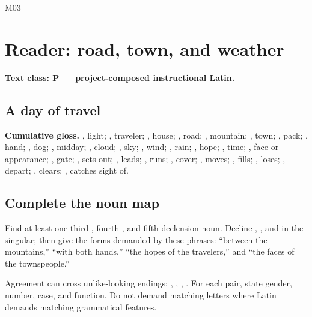 \begin{courseunit}{M03}
\chapter{Reader: road, town, and weather}

\textbf{Text class: P --- project-composed instructional Latin.}

\section{A day of travel}


\textbf{Cumulative gloss.} , light; , traveler;
, house; , road; , mountain;
, town; , pack; , hand;
, dog; , midday; , cloud;
, sky; , wind; , rain;
, hope; , time; , face or appearance;
, gate; , sets out; , leads;
, runs; , cover; , moves;
, fills; , loses; , depart;
, clears; , catches sight of.

\section{Complete the noun map}

Find at least one third-, fourth-, and fifth-declension noun.  Decline
, , and  in the singular; then give the
forms demanded by these phrases: ``between the mountains,'' ``with both
hands,'' ``the hopes of the travelers,'' and ``the faces of the townspeople.''

Agreement can cross unlike-looking endings: ,
, , .  For each
pair, state gender, number, case, and function.  Do not demand matching letters
where Latin demands matching grammatical features.


\end{courseunit}
